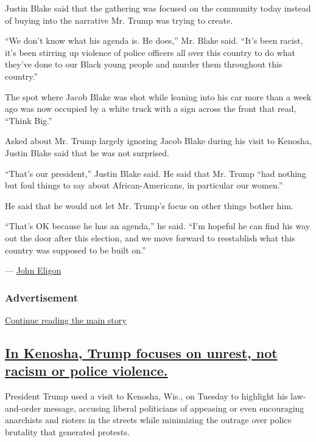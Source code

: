 Justin Blake said that the gathering was focused on the community today
instead of buying into the narrative Mr. Trump was trying to create.

``We don't know what his agenda is. He does,'' Mr. Blake said. ``It's
been racist, it's been stirring up violence of police officers all over
this country to do what they've done to our Black young people and
murder them throughout this country.''

The spot where Jacob Blake was shot while leaning into his car more than
a week ago was now occupied by a white truck with a sign across the
front that read, ``Think Big.''

Asked about Mr. Trump largely ignoring Jacob Blake during his visit to
Kenosha, Justin Blake said that he was not surprised.

``That's our president,'' Justin Blake said. He said that Mr. Trump
``had nothing but foul things to say about African-Americans, in
particular our women.''

He said that he would not let Mr. Trump's focus on other things bother
him.

``That's OK because he has an agenda,'' he said. ``I'm hopeful he can
find his way out the door after this election, and we move forward to
reestablish what this country was supposed to be built on.''

--- \href{https://www.nytimes3xbfgragh.onion/by/john-eligon}{John
Eligon}

\hypertarget{advertisement}{%
\subsubsection{Advertisement}\label{advertisement}}

\protect\hyperlink{after-dfp-ad-mid1}{Continue reading the main story}

\hypertarget{in-kenosha-trump-focuses-on-unrest-not-racism-or-police-violence}{%
\subsection{\texorpdfstring{\protect\hyperlink{in-kenosha-trump-focuses-on-unrest-not-racism-or-police-violence}{In
Kenosha, Trump focuses on unrest, not racism or police
violence.}}{In Kenosha, Trump focuses on unrest, not racism or police violence.}}\label{in-kenosha-trump-focuses-on-unrest-not-racism-or-police-violence}}

President Trump used a visit to Kenosha, Wis., on Tuesday to highlight
his law-and-order message, accusing liberal politicians of appeasing or
even encouraging anarchists and rioters in the streets while minimizing
the outrage over police brutality that generated protests.

